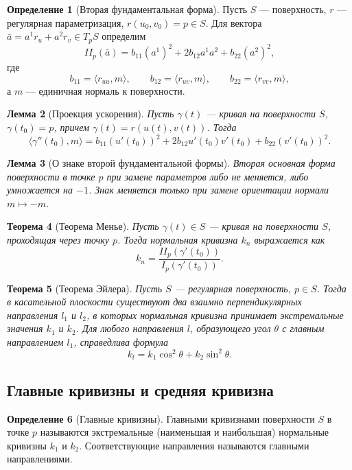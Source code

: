 \documentclass[12pt,a4paper]{article}
\newtheorem{theorem}{Теорема}[section]
\newtheorem{lemma}[theorem]{Лемма}
\theoremstyle{definition}
\newtheorem{definition}[theorem]{Определение}
\begin{document}
\begin{definition}[Вторая фундаментальная форма]
Пусть $S$ --- поверхность, $r$ --- регулярная параметризация, $r(u_0, v_0) = p \in S$. Для вектора $\bar{a} = a^1 r_u + a^2 r_v \in T_pS$ определим
$$II_p(\bar{a}) = b_{11}(a^1)^2 + 2b_{12}a^1a^2 + b_{22}(a^2)^2,$$
где
$$b_{11} = \langle r_{uu}, m \rangle,\qquad b_{12} = \langle r_{uv}, m \rangle,\qquad b_{22} = \langle r_{vv}, m \rangle,$$
а $m$ --- единичная нормаль к поверхности.
\end{definition}

\begin{lemma}[Проекция ускорения]
Пусть $\gamma(t)$ --- кривая на поверхности $S$, $\gamma(t_0)=p$,
причем $\gamma(t)=r(u(t),v(t))$. Тогда
$$
\langle \gamma''(t_0), m \rangle = b_{11}(u'(t_0))^2 + 2b_{12}u'(t_0)v'(t_0) + b_{22}(v'(t_0))^2.
$$
\end{lemma}

\begin{lemma}[О знаке второй фундаментальной формы]
Вторая основная форма поверхности в точке $p$ при замене параметров либо не меняется, либо умножается на $-1$. Знак меняется только при замене ориентации нормали $m \mapsto -m$.
\end{lemma}

\begin{theorem}[Теорема Менье]
Пусть $\gamma(t) \in S$ --- кривая на поверхности $S$, проходящая через точку $p$. Тогда нормальная кривизна $k_n$ выражается как
$$k_n = \frac{II_p(\gamma'(t_0))}{I_p(\gamma'(t_0))}.$$
\end{theorem}

\begin{theorem}[Теорема Эйлера]
Пусть $S$ --- регулярная поверхность, $p \in S$. Тогда в касательной плоскости существуют два взаимно перпендикулярных направления $l_1$ и $l_2$, в которых нормальная кривизна принимает экстремальные значения $k_1$ и $k_2$. Для любого направления $l$, образующего угол $\theta$ с главным направлением $l_1$, справедлива формула
$$k_l = k_1 \cos^2 \theta + k_2 \sin^2 \theta.$$
\end{theorem}

\subsection{Главные кривизны и средняя кривизна}

\begin{definition}[Главные кривизны]
Главными кривизнами поверхности $S$ в точке $p$ называются экстремальные (наименьшая и наибольшая) нормальные кривизны $k_1$ и $k_2$. Соответствующие направления называются главными направлениями.
\end{definition}
\end{document}
